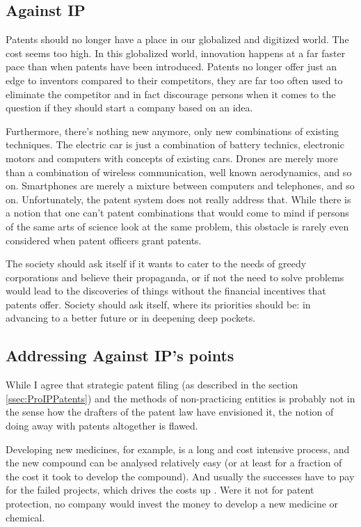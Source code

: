 \documentclass[a4paper]{report}
\begin{document}
\subsection{Against IP}
Patents should no longer have a place in our globalized and digitized world. The cost seems too high. In this globalized world, innovation happens at a far faster pace than when patents have been introduced. Patents no longer offer just an edge to inventors compared to their competitors, they are far too often used to eliminate the competitor and in fact discourage persons when it comes to the question if they should start a company based on an idea.

Furthermore, there's nothing new anymore, only new combinations of existing techniques. The electric car is just a combination of battery technics, electronic motors and computers with concepts of existing cars. Drones are merely more than a combination of wireless communication, well known aerodynamics, and so on. Smartphones are merely a mixture between computers and telephones, and so on. Unfortunately, the patent system does not really address that. While there is a notion that one can't patent combinations that would come to mind if persons of the same arts of science look at the same problem, this obstacle is rarely even considered when patent officers grant patents.

The society should ask itself if it wants to cater to the needs of greedy corporations and believe their propaganda, or if not the need to solve problems would lead to the discoveries of things without the financial incentives that patents offer. Society should ask itself, where its priorities should be: in advancing to a better future or in deepening deep pockets.

\subsection{Addressing Against IP's points}
While I agree that strategic patent filing (as described in the section \ref{ssec:ProIPPatents}) and the methods of non-practicing entities is probably not in the sense how the drafters of the patent law have envisioned it, the notion of doing away with patents altogether is flawed. 

Developing new medicines, for example, is a long and cost intensive process, and the new compound can be analysed relatively easy (or at least for a fraction of the cost it took to develop the compound). And usually the successes have to pay for the failed projects, which drives the costs up \parencite{Herper2012}. Were it not for patent protection, no company would invest the money to develop a new medicine or chemical.
\end{document}
